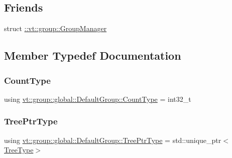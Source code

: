\subsection*{Friends}
\begin{DoxyCompactItemize}
\item 
struct \hyperlink{structvt_1_1group_1_1global_1_1_default_group_ab9d2dc7a29fd794bd88aff6d07f90527}{\+::vt\+::group\+::\+Group\+Manager}
\end{DoxyCompactItemize}


\subsection{Member Typedef Documentation}
\mbox{\label{structvt_1_1group_1_1global_1_1_default_group_a838e3ed0bd877d6ff703705c00c66e95}} 
\subsubsection{\texorpdfstring{Count\+Type}{CountType}}
{\footnotesize\ttfamily using \hyperlink{structvt_1_1group_1_1global_1_1_default_group_a838e3ed0bd877d6ff703705c00c66e95}{vt\+::group\+::global\+::\+Default\+Group\+::\+Count\+Type} =  int32\+\_\+t}

\mbox{\label{structvt_1_1group_1_1global_1_1_default_group_ab4b43c814196cd22463cfa0caad333d6}} 
\subsubsection{\texorpdfstring{Tree\+Ptr\+Type}{TreePtrType}}
{\footnotesize\ttfamily using \hyperlink{structvt_1_1group_1_1global_1_1_default_group_ab4b43c814196cd22463cfa0caad333d6}{vt\+::group\+::global\+::\+Default\+Group\+::\+Tree\+Ptr\+Type} =  std\+::unique\+\_\+ptr$<$\hyperlink{structvt_1_1group_1_1global_1_1_default_group_a86d7ec049ad79c17fcb6b428534d0c1c}{Tree\+Type}$>$}

